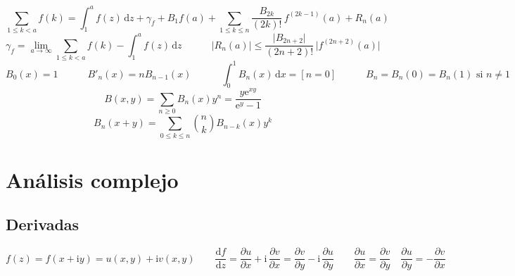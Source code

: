 \documentclass[fleqn, spanish]{article}
\begin{document}
  \begin{equation*}
    \sum_{1 \le k < a} f(k)
      = \int_1^a f(z) \, \mathrm{d} z
	 + \gamma_f
	 + B_1 f(a)
	 + \sum_{1 \le k \le n} \frac{B_{2 k}}{(2 k)!} \, f^{(2 k - 1)}(a)
	 + R_n(a)
  \end{equation*}
  \begin{equation*}
    \gamma_f
      = \lim_{a \rightarrow \infty}
	  \sum_{1 \le k < a} f(k)
	  - \int_1^a f(z) \, \mathrm{d} z
     \hspace{3em}
     \lvert R_n(a) \rvert
	\le \frac{\lvert B_{2 n + 2} \rvert}{(2 n + 2)!}
	      \, \lvert f^{(2 n + 2)}(a) \rvert
  \end{equation*}
  \begin{equation*}
    B_0(x)
      = 1 \hspace{3em}
    B'_n (x)
      = n B_{n - 1} (x)
    \hspace{3em}
    \int_0^1 B_n(x) \, \mathrm{d} x
      = [n = 0]
    \hspace{3em}
    B_n = B_n(0) = B_n(1) \text{\ si \(n \ne 1\)}
  \end{equation*}
  \begin{equation*}
    B(x, y)
      = \sum_{n \ge 0} B_n(x) y^n
      = \frac{y \mathrm{e}^{x y}}{\mathrm{e}^y - 1}
  \end{equation*}
  \begin{equation*}
    B_n (x + y)
      = \sum_{0 \le k \le n} \binom{n}{k} B_{n - k} (x) y^k
  \end{equation*}

\section*{Análisis complejo}
\label{sec:analisis-complejo}

\subsection*{Derivadas}
\label{sec:derivadas}

  \begin{equation*}
    f(z)
      = f(x + \mathrm{i} y)
      = u(x, y) + \mathrm{i} v(x, y)
    \qquad
    \frac{\mathrm{d} f}{\mathrm{d} z}
      = \frac{\partial u}{\partial x}
	  + \mathrm{i} \, \frac{\partial v}{\partial x}
      = \frac{\partial v}{\partial y}
	  - \mathrm{i} \, \frac{\partial u}{\partial y}
    \qquad
    \frac{\partial u}{\partial x} = \frac{\partial v}{\partial y}
    \quad
    \frac{\partial u}{\partial y} = - \frac{\partial v}{\partial x}
  \end{equation*}
\end{document}
